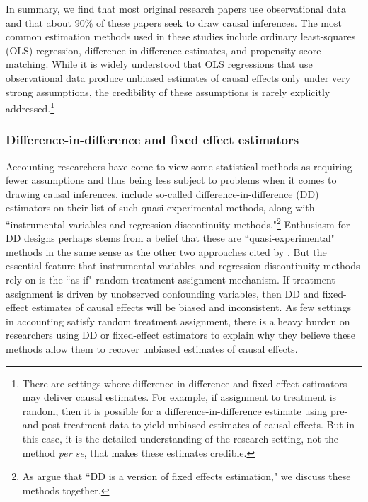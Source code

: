 \documentclass[12pt,reqno,titlepage]{amsart}
\begin{document}
\begin{doublespace}
In summary, we find that most original research papers use observational data and that about 90\% of these papers seek to draw causal inferences.
The most common estimation methods used in these studies include ordinary least-squares (OLS) regression, difference-in-difference estimates, and propensity-score matching.
While it is widely understood that OLS regressions that use observational data produce unbiased estimates of causal effects only under very strong assumptions, the credibility of these assumptions is rarely explicitly addressed.\footnote{
There are settings where difference-in-difference and fixed effect estimators may deliver causal estimates.
For example, if assignment to treatment is random, then it is possible for a difference-in-difference estimate using pre- and post-treatment data to yield unbiased estimates of causal effects.
But in this case, it is the detailed understanding of the research setting, not the method \emph{per se}, that makes these estimates credible.}

\subsubsection{Difference-in-difference and fixed effect estimators}
Accounting researchers have come to view some statistical methods as requiring fewer assumptions and thus being less subject to problems when it comes to drawing causal inferences. 
\citet[p.\,12]{Angrist:2010jv} include so-called difference-in-difference (DD) estimators on their list of such quasi-experimental methods, along with ``instrumental variables and regression discontinuity methods."\footnote{As \citet[p.\,228]{Angrist:2008vk} argue that ``DD is a version of fixed effects estimation," we discuss these methods together.}
Enthusiasm for DD designs perhaps stems from a belief that these are ``quasi-experimental" methods in the same sense as the other two approaches cited by \citet[p.\,12]{Angrist:2010jv}.
But the essential feature that instrumental variables and regression discontinuity methods rely on is the ``as if" random treatment assignment mechanism.
If treatment assignment is driven by unobserved confounding variables, then DD and fixed-effect estimates of causal effects will be biased and inconsistent. 
As few settings in accounting satisfy random treatment assignment, there is a heavy burden on researchers using DD or fixed-effect estimators to explain why they believe these methods allow them to recover unbiased estimates of causal effects.


\end{doublespace}
\end{document}

